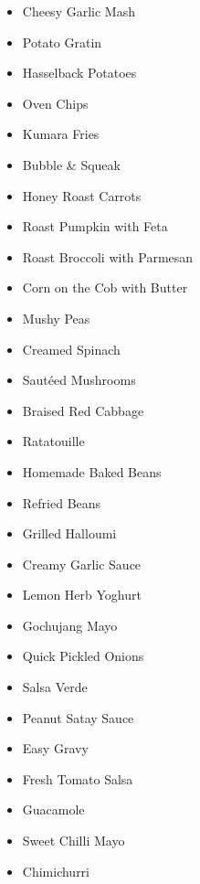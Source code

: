 \begin{itemize}
  \item \todo Cheesy Garlic Mash
  \item \todo Potato Gratin
  \item \todo Hasselback Potatoes
  \item \todo Oven Chips
  \item \todo Kumara Fries
  \item \todo Bubble \& Squeak 
  \item \todo Honey Roast Carrots
  \item \todo Roast Pumpkin with Feta
  \item \todo Roast Broccoli with Parmesan
  \item \todo Corn on the Cob with Butter
  \item \todo Mushy Peas
  \item \todo Creamed Spinach
  \item \todo Saut\'eed Mushrooms
  \item \todo Braised Red Cabbage
  \item \todo Ratatouille
  \item \todo Homemade Baked Beans
  \item \todo Refried Beans
  \item \todo Grilled Halloumi
\end{itemize}

\begin{itemize}
  \item \todo Creamy Garlic Sauce
  \item \todo Lemon Herb Yoghurt
  \item \todo Gochujang Mayo
  \item \todo Quick Pickled Onions
  \item \todo Salsa Verde
  \item \todo Peanut Satay Sauce
  \item \todo Easy Gravy
  \item \todo Fresh Tomato Salsa
  \item \todo Guacamole
  \item \todo Sweet Chilli Mayo
  \item \todo Chimichurri
\end{itemize}
